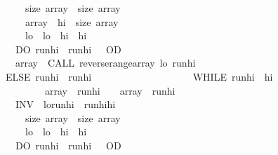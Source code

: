 \begin{isabellebody}
\ \ \ \ \ \ \ \ \ \ \ \ \ \ \ \ \ \ \ \ size\ {\isasymacute}array\ {\isacharequal}\ size\ \isactrlbsup {\isasymsigma}\isactrlesup array\ {\isasymand}\isanewline
\ \ \ \ \ \ \ \ \ \ \ \ \ \ \ \ \ \ \ \ \isactrlbsup {\isasymsigma}\isactrlesup array{\isasymnoteq}{\isacharbrackleft}{\isacharbrackright}\ {\isasymand}\ {\isasymacute}hi\ {\isasymle}\ size\ \isactrlbsup {\isasymsigma}\isactrlesup array\ {\isasymand}\isanewline
\ \ \ \ \ \ \ \ \ \ \ \ \ \ \ \ \ \ \ \ {\isasymacute}lo\ {\isacharequal}\ \isactrlbsup {\isasymsigma}\isactrlesup lo\ {\isasymand}\ {\isasymacute}hi\ {\isacharequal}\ \isactrlbsup {\isasymsigma}\isactrlesup hi{\isasymrbrace}\ \isanewline
\ \ \ \ \ \ \ \ \ \ \ \ \ \ \ \ \ \ DO\ {\isasymacute}run{\isacharunderscore}hi\ {\isacharcolon}{\isacharequal}{\isacharequal}\ {\isasymacute}run{\isacharunderscore}hi\ {\isacharplus}\ {}\ OD{\isacharsemicolon}{\isacharsemicolon}\isanewline
\ \ \ \ \ \ \ \ \ \ \ \ \ \ \ \ \ \ {\isasymacute}array\ {\isacharcolon}{\isacharequal}{\isacharequal}\ CALL\ reverse{\isacharunderscore}range{\isacharparenleft}{\isasymacute}array{\isacharcomma}\ {\isasymacute}lo{\isacharcomma}\ {\isasymacute}run{\isacharunderscore}hi{\isacharparenright}\isanewline
\ \ \ \ \ \ \ \ \ \ \ \ \ \ \ \ ELSE\ {\isasymacute}run{\isacharunderscore}hi\ {\isacharcolon}{\isacharequal}{\isacharequal}\ {\isasymacute}run{\isacharunderscore}hi\ {\isacharplus}\ {}{\isacharsemicolon}{\isacharsemicolon}\isanewline
\ \ \ \ \ \ \ \ \ \ \ \ \ \ \ \ \ \ WHILE\ {\isasymacute}run{\isacharunderscore}hi\ {\isacharless}\ {\isasymacute}hi\ {\isasymand}\isanewline
\ \ \ \ \ \ \ \ \ \ \ \ \ \ \ \ \ \ \ \ \ \ \ \ {\isasymacute}array\ {\isacharbang}\ {\isacharparenleft}{\isasymacute}run{\isacharunderscore}hi\ {\isacharminus}\ {}{\isacharparenright}\ {\isasymle}\ {\isasymacute}array\ {\isacharbang}\ {\isasymacute}run{\isacharunderscore}hi\ \isanewline
\ \ \ \ \ \ \ \ \ \ \ \ \ \ \ \ \ \ INV\ {\isasymlbrace}\ {\isasymacute}lo{\isacharless}{\isasymacute}run{\isacharunderscore}hi\ {\isasymand}\ {\isasymacute}run{\isacharunderscore}hi{\isasymle}{\isasymacute}hi\ {\isasymand}\isanewline
\ \ \ \ \ \ \ \ \ \ \ \ \ \ \ \ \ \ \ \ size\ {\isasymacute}array\ {\isacharequal}\ size\ \isactrlbsup {\isasymsigma}\isactrlesup array\ {\isasymand}\isanewline
\ \ \ \ \ \ \ \ \ \ \ \ \ \ \ \ \ \ \ \ {\isasymacute}lo\ {\isacharequal}\ \isactrlbsup {\isasymsigma}\isactrlesup lo\ {\isasymand}\ {\isasymacute}hi\ {\isacharequal}\ \isactrlbsup {\isasymsigma}\isactrlesup hi{\isasymrbrace}\ \isanewline
\ \ \ \ \ \ \ \ \ \ \ \ \ \ \ \ \ \ DO\ {\isasymacute}run{\isacharunderscore}hi\ {\isacharcolon}{\isacharequal}{\isacharequal}\ {\isasymacute}run{\isacharunderscore}hi\ {\isacharplus}\ {}\ OD\isanewline

\end{isabellebody}
